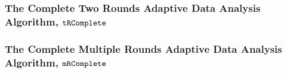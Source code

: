  \subsubsection{The Complete Two Rounds Adaptive Data Analysis Algorithm, $\mathtt{tRComplete}$} 
 
 \subsubsection{The Complete Multiple Rounds Adaptive Data Analysis Algorithm, $\mathtt{mRComplete}$} 
 
% 
% 

% 
